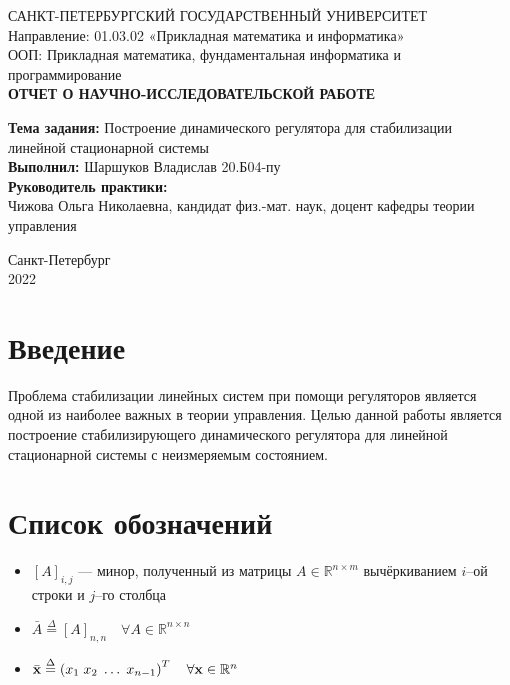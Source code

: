 \documentclass[a4paper,14pt]{article}
\theoremstyle{definition}
\begin{document}
\begin{titlepage}
  \begin{center}
    САНКТ-ПЕТЕРБУРГСКИЙ ГОСУДАРСТВЕННЫЙ УНИВЕРСИТЕТ \\
    Направление: 01.03.02 «Прикладная математика и информатика» \\
    ООП: Прикладная математика, фундаментальная информатика и программирование \\[4cm]
    
    \textbf{ОТЧЕТ О НАУЧНО-ИССЛЕДОВАТЕЛЬСКОЙ РАБОТЕ}\\
  \end{center}
  \textbf{Тема задания:} Построение динамического регулятора для стабилизации линейной стационарной системы \\[0.5cm]
  \textbf{Выполнил:} Шаршуков Владислав \qquad 20.Б04-пу \\ [1.5cm] 
  \textbf{Руководитель практики:} \\Чижова Ольга Николаевна, кандидат физ.-мат. наук, доцент кафедры теории управления
  \vspace{5cm}
  \begin{center}
    Санкт-Петербург\\
    2022
  \end{center}
\end{titlepage}

\setcounter{page}{2}

\begin{center}
  \tableofcontents
\end{center}

\newpage

\section{Введение}


Проблема стабилизации линейных систем при помощи регуляторов является
одной из наиболее важных в теории управления.
Целью данной работы является построение стабилизирующего динамического
регулятора для линейной стационарной системы с неизмеряемым состоянием.

\section{Список обозначений}

\begin{itemize}
\item $\left[A\right]_{i,j}$ --- минор, полученный из матрицы $A \in \mathbb{R}^{n \times m}$
  вычёркиванием $i$--ой строки и $j$--го столбца
\item $\bar{A} \overset{\Delta}{=} \left[A\right]_{n,n} \quad \forall A \in \mathbb{R}^{n \times n}$
\item $\bar{\vb{x}} \overset{\Delta}{=} \left(x_1 \; x_2 \; \dots \; x_{n-1}\right)^T \quad \forall \vb{x} \in \mathbb{R}^n$
\end{itemize}
\end{document}
